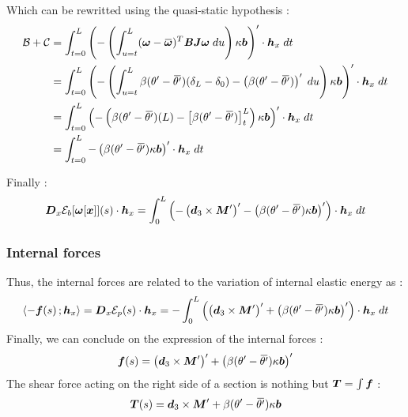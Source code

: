 Which can be rewritted using the quasi-static hypothesis :
\begin{equation}
	\begin{aligned}
	\mathcal{B}+\mathcal{C}
	&=
	\int_{t=0}^{L} \left(
	-\left(\int_{u=t}^{L}(\vect{\omega} - \overbar{\vect{\omega}})^T \mat{B}\mat{J}\vect{\omega}\;du\right)
	\kappa\vect{b}
	\right)'\cdot \vect{h}_x \;dt\\
	&=
	\int_{t=0}^{L} \left(
	-\left(
	\int_{u=t}^{L}\beta(\theta' -{\overbar{\theta'}})(\delta_L-\delta_0) - \left(\beta(\theta' -{\overbar{\theta'}})\right)'\;du
	\right)
	\kappa\vect{b}
	\right)'\cdot \vect{h}_x \;dt\\
	&=
	\int_{t=0}^{L} \left(
	-\left(
	\beta(\theta' -{\overbar{\theta'}})(L) - \left[\beta(\theta' -{\overbar{\theta'}})\right]_t^L
	\right)
	\kappa\vect{b}
	\right)'\cdot \vect{h}_x \;dt\\
		&=
	\int_{t=0}^{L} -\left(
	\beta(\theta' -{\overbar{\theta'}})
	\kappa\vect{b}
	\right)'\cdot \vect{h}_x \;dt\\
	\end{aligned}
\end{equation}

Finally :
\begin{equation}
		\pdiffof{x}{\mathcal{E}_b[\vect{\omega}[\vect{x}]]}{s}{\vect{h}_x}
		=
		\int_{0}^{L} \left(
		- \left({\vect{d}_3} \times \vect{M}'\right)' 
		- \left(\beta(\theta' -{\overbar{\theta'}}) \kappa\vect{b}\right)'
		\right)\cdot \vect{h}_x \;dt\\
\end{equation}

\subsubsection{Internal forces}

Thus, the internal forces are related to the variation of internal elastic energy as :
\begin{equation}
	\begin{aligned}
	\scalar{-\vect{f}(s)}{\vect{h}_x} &= \pdiffof{x}{\mathcal{E}_p}{s}{\vect{h}_x}
		=
		- \int_{0}^{L} \left(
		\left({\vect{d}_3} \times \vect{M}'\right)' 
		+ \left(\beta(\theta' -{\overbar{\theta'}}) \kappa\vect{b}\right)'
		\right)\cdot \vect{h}_x \;dt\\
	\end{aligned}
\end{equation}
Finally, we can conclude on the expression of the internal forces :
\begin{equation}
	\vect{f}(s) = \left({\vect{d}_3} \times \vect{M}'\right)' 
		+ \left(\beta(\theta' -{\overbar{\theta'}}) \kappa\vect{b}\right)'
\end{equation}
The shear force acting on the right side of a section is nothing but $\boldsymbol{T} = \int \boldsymbol{f}$ :
\begin{equation}
	\vect{T}(s) = \vect{d}_3 \times \vect{M}'
		+ \beta(\theta' -{\overbar{\theta'}}) \kappa\vect{b}
\end{equation}


